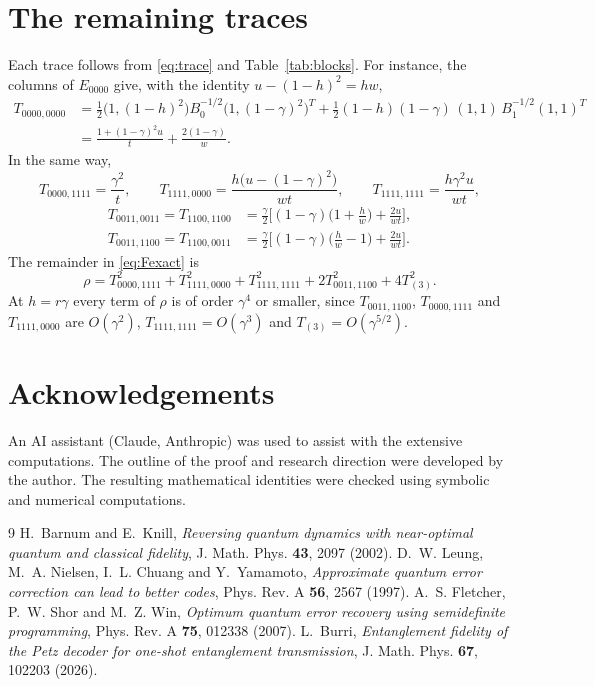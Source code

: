 \documentclass[11pt,a4paper]{article}
\theoremstyle{plain}
\begin{document}
\section{The remaining traces}\label{app:traces}

Each trace follows from \eqref{eq:trace} and Table~\ref{tab:blocks}. For instance, the columns of $E_{0000}$ give, with the identity $u-(1-h)^2=hw$,
\[
\begin{aligned}
T_{0000,0000}&=\tfrac12\big(1,(1-h)^2\big)B_0^{-1/2}\big(1,(1-\gamma)^2\big)^T+\tfrac12(1-h)(1-\gamma)\,(1,1)\,B_1^{-1/2}(1,1)^T\\
&=\frac{1+(1-\gamma)^2u}{t}+\frac{2(1-\gamma)}w .
\end{aligned}
\]
In the same way,
\[
T_{0000,1111}=\frac{\gamma^2}t,\qquad T_{1111,0000}=\frac{h\big(u-(1-\gamma)^2\big)}{wt},\qquad T_{1111,1111}=\frac{h\gamma^2u}{wt},
\]
\[
\begin{aligned}
T_{0011,0011}=T_{1100,1100}&=\frac\gamma2\Big[(1-\gamma)\Big(1+\frac hw\Big)+\frac{2u}{wt}\Big],\\
T_{0011,1100}=T_{1100,0011}&=\frac\gamma2\Big[(1-\gamma)\Big(\frac hw-1\Big)+\frac{2u}{wt}\Big].
\end{aligned}
\]
The remainder in \eqref{eq:Fexact} is
\[
\rho=T_{0000,1111}^2+T_{1111,0000}^2+T_{1111,1111}^2+2T_{0011,1100}^2+4T_{(3)}^2 .
\]
At $h=r\gamma$ every term of $\rho$ is of order $\gamma^4$ or smaller, since $T_{0011,1100}$, $T_{0000,1111}$ and $T_{1111,0000}$ are $O(\gamma^2)$, $T_{1111,1111}=O(\gamma^3)$ and $T_{(3)}=O(\gamma^{5/2})$.

\section*{Acknowledgements}
An AI assistant (Claude, Anthropic) was used to assist with the extensive computations. The outline of the proof and research direction were developed by the author. The resulting mathematical identities were checked using symbolic and numerical computations.

\begin{thebibliography}{9}
 H.~Barnum and E.~Knill, \emph{Reversing quantum dynamics with near-optimal quantum and classical fidelity}, J. Math. Phys. \textbf{43}, 2097 (2002).
 D.~W. Leung, M.~A. Nielsen, I.~L. Chuang and Y.~Yamamoto, \emph{Approximate quantum error correction can lead to better codes}, Phys. Rev. A \textbf{56}, 2567 (1997).
 A.~S. Fletcher, P.~W. Shor and M.~Z. Win, \emph{Optimum quantum error recovery using semidefinite programming}, Phys. Rev. A \textbf{75}, 012338 (2007).
 L.~Burri, \emph{Entanglement fidelity of the Petz decoder for one-shot entanglement transmission}, J. Math. Phys. \textbf{67}, 102203 (2026).
\end{thebibliography}
\end{document}
